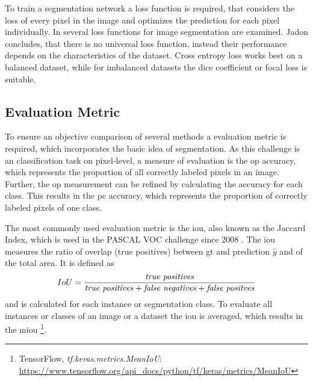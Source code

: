 To train a segmentation network a loss function is required, that considers the loss of every pixel in the image and optimizes the prediction for each pixel individually.
In \cite{Jad20-LossFunction} several loss functions for image segmentation are examined.
Jadon concludes, that there is no universal loss function, instead their performance depends on the characteristics of the dataset.
Cross entropy loss works best on a balanced dataset, while for imbalanced datasets the dice coefficient or focal loss is suitable.


\subsection{Evaluation Metric}\label{ord:ch2:sec2:subsec2}
To ensure an objective comparison of several methods a evaluation metric is required, which incorporates the basic idea of segmentation.
As this challenge is an classification task on pixel-level, a measure of evaluation is the \gls{op} accuracy, which represents the proportion of all correctly labeled pixels in an image.
Further, the \gls{op} measurement can be refined by calculating the accuracy for each class.
This results in the \gls{pc} accuracy, which represents the proportion of correctly labeled pixels of one class.

The most commonly used evaluation metric is the \gls{iou}, also known as the Jaccard Index, which is used in the PASCAL VOC challenge \cite{Eve20-PascalVOC} since 2008 \cite{Csu13-EvalMetric}. 
The \gls{iou} measures the ratio of overlap (true positives) between \gls{gt} and prediction $\hat{y}$ and of the total area. 
It is defined as
\begin{equation} \label{equ:iou}
	\centering
	IoU = \frac{\textnormal{\textit{true positives}}}{\textnormal{\textit{true positives}} + \textnormal{\textit{false negatives}} + \textnormal{\textit{false positves}}}
\end{equation}
and is calculated for each instance or segmentation class.
To evaluate all instances or classes of an image or a dataset the \gls{iou} is averaged, which results in the \gls{miou} 
\footnote{TensorFlow, \textit{tf.keras.metrics.MeanIoU}: \url{https://www.tensorflow.org/api_docs/python/tf/keras/metrics/MeanIoU}}.

